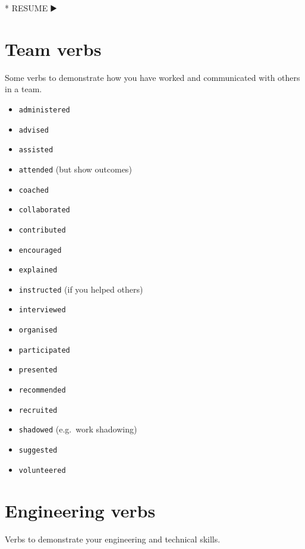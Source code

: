 \documentclass[
]{book}
\newenvironment{Shaded}{\begin{snugshade}}{\end{snugshade}}
\newcommand{\NormalTok}[1]{#1}
\newcommand{\SpecialStringTok}[1]{\textcolor[rgb]{0.31,0.60,0.02}{#1}}
\providecommand{\tightlist}{%
  \setlength{\itemsep}{0pt}\setlength{\parskip}{0pt}}
\begin{document}
\begin{Shaded}
\begin{Highlighting}[]
\SpecialStringTok{* }\NormalTok{RESUME ▶️}
\end{Highlighting}
\end{Shaded}

\hypertarget{joining}{%
\section{Team verbs}\label{joining}}

Some verbs to demonstrate how you have worked and communicated with others in a team.

\begin{itemize}
\tightlist
\item
  \texttt{administered}
\item
  \texttt{advised}
\item
  \texttt{assisted}
\item
  \texttt{attended} (but show outcomes)
\item
  \texttt{coached}
\item
  \texttt{collaborated}
\item
  \texttt{contributed}
\item
  \texttt{encouraged}
\item
  \texttt{explained}
\item
  \texttt{instructed} (if you helped others)
\item
  \texttt{interviewed}
\item
  \texttt{organised}
\item
  \texttt{participated}
\item
  \texttt{presented}
\item
  \texttt{recommended}
\item
  \texttt{recruited}
\item
  \texttt{shadowed} (e.g.~work shadowing)
\item
  \texttt{suggested}
\item
  \texttt{volunteered}
\end{itemize}

\hypertarget{engineering}{%
\section{Engineering verbs}\label{engineering}}

Verbs to demonstrate your engineering and technical skills.
\end{document}
